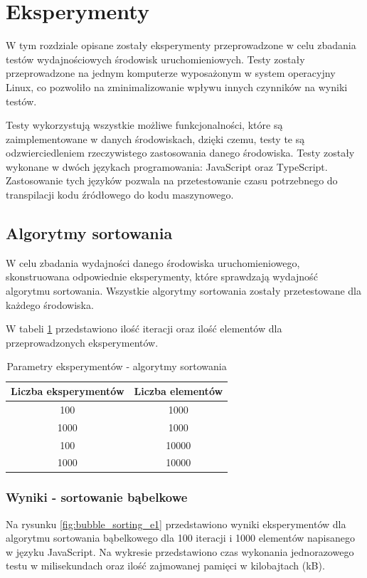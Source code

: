 \section{Eksperymenty}\label{sec:experiments}
W tym rozdziale opisane zostały eksperymenty przeprowadzone w celu zbadania testów wydajnościowych środowisk uruchomieniowych. Testy zostały przeprowadzone na jednym komputerze wyposażonym w system operacyjny Linux, co pozwoliło na zminimalizowanie wpływu innych czynników na wyniki testów.

Testy wykorzystują wszystkie możliwe funkcjonalności, które są zaimplementowane w danych środowiskach, dzięki czemu, testy te są odzwierciedleniem rzeczywistego zastosowania danego środowiska. Testy zostały wykonane w dwóch językach programowania: JavaScript oraz TypeScript. Zastosowanie tych języków pozwala na przetestowanie czasu potrzebnego do transpilacji kodu źródłowego do kodu maszynowego. 

\subsection{Algorytmy sortowania}
W celu zbadania wydajności danego środowiska uruchomieniowego, skonstruowana odpowiednie eksperymenty, które sprawdzają wydajność algorytmu sortowania. Wszystkie algorytmy sortowania zostały przetestowane dla każdego środowiska.

W tabeli \ref{tab:sorting_experiments} przedstawiono ilość iteracji oraz ilość elementów dla przeprowadzonych eksperymentów.

\begin{table}[H]
  \centering
  \caption{Parametry eksperymentów - algorytmy sortowania}
  \begin{tabular}{|c|c|}
    \hline
    \textbf{Liczba eksperymentów} & \textbf{Liczba elementów} \\ \hline
    100 & 1000 \\ \hline
    1000 & 1000 \\ \hline
    100 & 10000 \\ \hline
    1000 & 10000 \\ \hline
  \end{tabular}
  \label{tab:sorting_experiments}
\end{table}

\subsubsection{Wyniki - sortowanie bąbelkowe}
Na rysunku \ref{fig:bubble_sorting_e1} przedstawiono wyniki eksperymentów dla algorytmu sortowania bąbelkowego dla 100 iteracji i 1000 elementów napisanego w języku JavaScript. Na wykresie przedstawiono czas wykonania jednorazowego testu w milisekundach oraz ilość zajmowanej pamięci w kilobajtach (kB).

